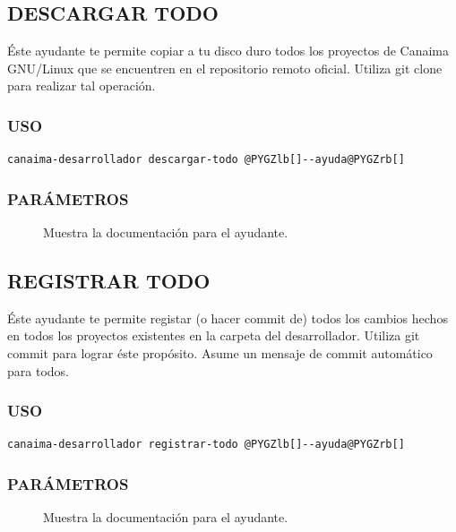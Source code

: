 \documentclass[letterpaper,12pt,spanish]{manual}
\begin{document}
\subsection{\textbf{DESCARGAR TODO}}

Éste ayudante te permite copiar a tu disco duro todos los proyectos de Canaima GNU/Linux que se encuentren en el repositorio remoto oficial. Utiliza git clone para realizar tal operación.


\subsubsection{USO}

\begin{Verbatim}[commandchars=@\[\]]
canaima-desarrollador descargar-todo @PYGZlb[]--ayuda@PYGZrb[]
\end{Verbatim}


\subsubsection{PARÁMETROS}
\begin{description}
\item[{}] \leavevmode
Muestra la documentación para el ayudante.

\end{description}


\subsection{\textbf{REGISTRAR TODO}}

Éste ayudante te permite registar (o hacer commit de) todos los cambios hechos en todos los proyectos existentes en la carpeta del desarrollador. Utiliza git commit para lograr éste propósito. Asume un mensaje de commit automático para todos.


\subsubsection{USO}

\begin{Verbatim}[commandchars=@\[\]]
canaima-desarrollador registrar-todo @PYGZlb[]--ayuda@PYGZrb[]
\end{Verbatim}


\subsubsection{PARÁMETROS}
\begin{description}
\item[{}] \leavevmode
Muestra la documentación para el ayudante.

\end{description}
\end{document}
